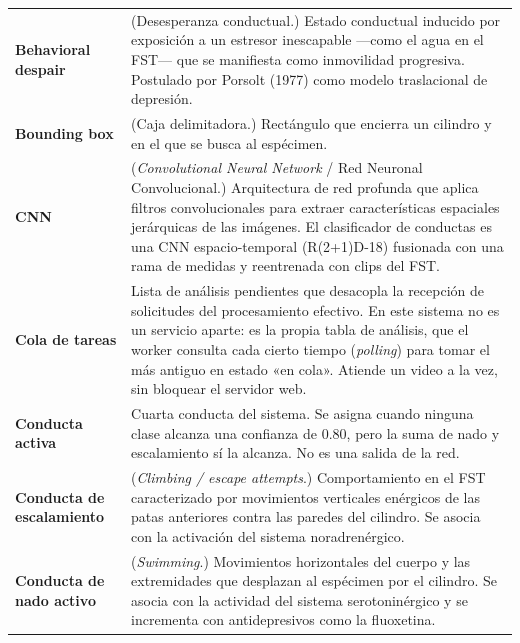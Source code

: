 \begin{longtable}{@{} p{4.0cm} p{10.9cm} @{}}
  \textbf{Behavioral despair}
  & (Desesperanza conductual.) Estado conductual inducido por exposición a un
    estresor inescapable —como el agua en el FST— que se manifiesta como
    inmovilidad progresiva. Postulado por Porsolt (1977) como modelo
    traslacional de depresión. \\[5pt]

  \textbf{Bounding box}
  & (Caja delimitadora.) Rectángulo que encierra un cilindro y en el que se busca al espécimen. \\[5pt]

  \textbf{CNN}
  & (\textit{Convolutional Neural Network} / Red Neuronal Convolucional.)
    Arquitectura de red profunda que aplica filtros convolucionales para extraer
    características espaciales jerárquicas de las imágenes. El clasificador de
    conductas es una CNN espacio-temporal (R(2+1)D-18) fusionada con una rama de
    medidas y reentrenada con clips del FST. \\[5pt]

  \textbf{Cola de tareas}
  & Lista de análisis pendientes que desacopla la recepción de solicitudes del
    procesamiento efectivo. En este sistema no es un servicio aparte: es la propia
    tabla de análisis, que el worker consulta cada cierto tiempo (\textit{polling})
    para tomar el más antiguo en estado «en cola». Atiende un video a la vez, sin
    bloquear el servidor web. \\[5pt]

  \textbf{Conducta activa}
  & Cuarta conducta del sistema. Se asigna cuando ninguna clase alcanza una confianza de 0.80, pero la suma de nado y escalamiento sí la alcanza. No es una salida de la red. \\[5pt]

  \textbf{Conducta de escalamiento}
  & (\textit{Climbing / escape attempts}.) Comportamiento en el FST caracterizado
    por movimientos verticales enérgicos de las patas anteriores contra las
    paredes del cilindro. Se asocia con la activación del sistema noradrenérgico. \\[5pt]

  \textbf{Conducta de nado activo}
  & (\textit{Swimming}.) Movimientos horizontales del cuerpo y las extremidades
    que desplazan al espécimen por el cilindro. Se asocia con la actividad del
    sistema serotoninérgico y se incrementa con antidepresivos como la
    fluoxetina. \\[5pt]


\end{longtable}
